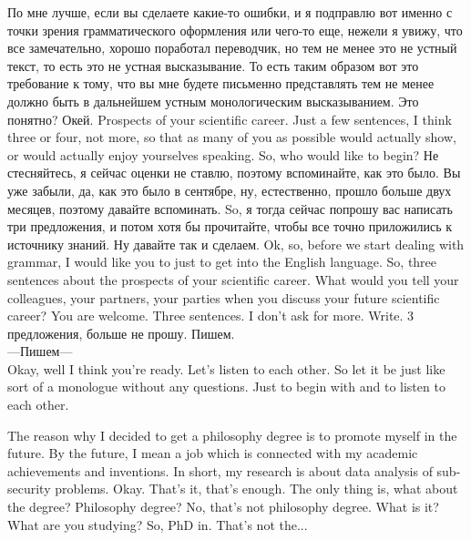 \documentclass[main.tex]{subfiles}
\begin{document}
По мне лучше, если вы сделаете какие-то ошибки, и я подправлю вот именно с точки зрения грамматического оформления или чего-то еще, нежели я увижу, что все замечательно, хорошо поработал переводчик, но тем не менее это не устный текст, то есть это не устная высказывание.
То есть таким образом вот это требование к тому, что вы мне будете письменно представлять тем не менее должно быть в дальнейшем устным монологическим высказыванием. Это понятно? Окей. Prospects of your scientific career. Just a few sentences, I think three or four, not more, so that as many of you as possible would actually show, or would actually enjoy yourselves speaking.
So, who would like to begin?
Не стесняйтесь, я сейчас оценки не ставлю, поэтому вспоминайте, как это было.
Вы уже забыли, да, как это было в сентябре, ну, естественно, прошло больше двух месяцев, поэтому давайте вспоминать.
So, я тогда сейчас попрошу вас написать три предложения, и потом хотя бы прочитайте, чтобы все точно приложились к источнику знаний.
Ну давайте так и сделаем.
Ok, so, before we start dealing with grammar, I would like you to just to get into the English language.
So, three sentences about the prospects of your scientific career.
What would you tell your colleagues, your partners, your parties when you discuss your future scientific career?
You are welcome.
Three sentences.
I don't ask for more.
Write.
3 предложения, больше не прошу.
Пишем.
\\

---Пишем---
\\

Okay, well I think you're ready.
Let's listen to each other.
So let it be just like sort of a monologue without any questions.
Just to begin with and to listen to each other.

The reason why I decided to get a philosophy degree is to promote myself in the future.
By the future, I mean a job which is connected with my academic achievements and inventions.
In short, my research is about data analysis of sub-security problems.
Okay.
That's it, that's enough.
The only thing is, what about the degree? Philosophy degree? No, that's not philosophy degree.
What is it? What are you studying? So, PhD in.
That's not the...
\end{document}
